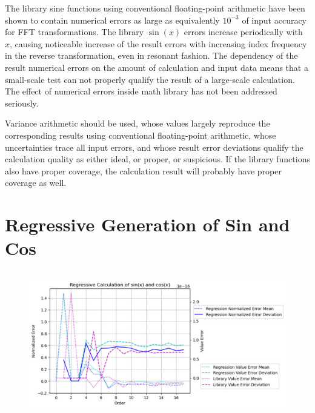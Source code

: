\documentclass[twoside]{article}
\numberwithin{equation}{section}
\begin{document}
The library sine functions using conventional floating-point arithmetic have been shown to contain numerical errors as large as equivalently  $10^{-3}$ of input accuracy for FFT transformations.
The library $\sin(x)$ errors increase periodically with $x$, causing noticeable increase of the result errors with increasing index frequency in the reverse transformation, even in resonant fashion.
The dependency of the result numerical errors on the amount of calculation and input data means that a small-scale test can not properly qualify the result of a large-scale calculation.
The effect of numerical errors inside math library has not been addressed seriously.

Variance arithmetic should be used, whose values largely reproduce the corresponding results using conventional floating-point arithmetic, whose uncertainties trace all input errors, and whose result error deviations qualify the calculation quality as either ideal, or proper, or suspicious.
If the library functions also have proper coverage, the calculation result will probably have proper coverage as well.







\clearpage
\section{Regressive Generation of Sin and Cos}
\label{sec: recursion}

\begin{figure}
\centering
\includegraphics[height=2.5in]{Uncertain_Sin.pdf}
\label{fig: Uncertain_Sin}
\end{figure}
\end{document}
